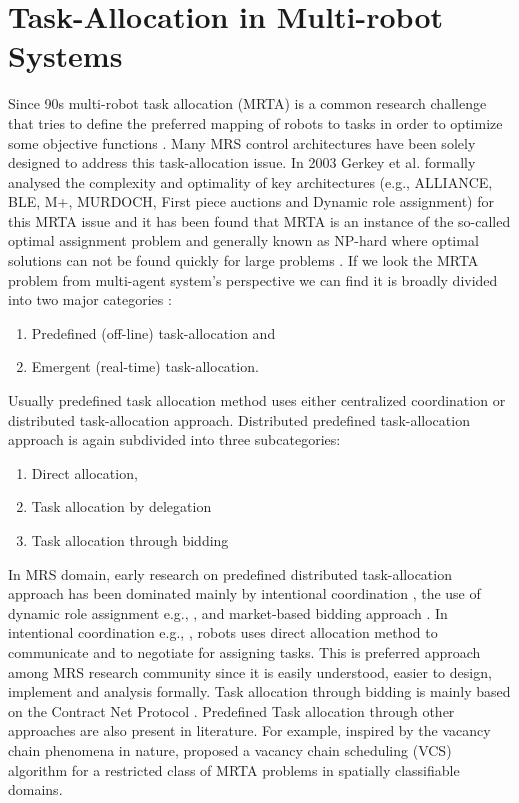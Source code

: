 \section{Task-Allocation in Multi-robot Systems}
Since 90s multi-robot task allocation (MRTA) is a common research challenge that tries to define the preferred mapping of robots to tasks in order to optimize some objective functions  \cite{Gerkey+2004}. Many MRS control architectures have been solely designed to address this task-allocation issue. In 2003 Gerkey et al. formally analysed the complexity and optimality of key architectures (e.g., ALLIANCE, BLE, M+, MURDOCH, First piece auctions and Dynamic role assignment) for this MRTA issue and it has been found that MRTA is an instance of the so-called optimal assignment problem \cite{Gerkey+2003} and generally known as NP-hard where optimal solutions can not be found quickly for large problems \cite{Gerkey+2004}. 
If we look the MRTA problem from multi-agent system's perspective we can find it is broadly divided into two major categories \cite{Shen+2001}: 
\begin{enumerate}
\item Predefined (off-line) task-allocation and 
\item Emergent (real-time) task-allocation. 
\end{enumerate}
Usually predefined task allocation method uses either centralized coordination or distributed task-allocation approach. Distributed predefined task-allocation approach is again subdivided into three subcategories: 
\begin{enumerate}
\item Direct allocation, 
\item Task allocation by delegation 
\item Task allocation through bidding
\end{enumerate}
In MRS domain, early research on predefined distributed task-allocation approach has been dominated mainly by intentional coordination \cite{Gerkey+2004,Parker1998}, the use of dynamic role assignment e.g., \cite{Chaimowicz2002}, and market-based bidding approach \cite{Dias+2006}. In intentional coordination e.g., \cite{Parker1998}, robots uses direct allocation method to communicate and to negotiate for assigning tasks. This is preferred approach among MRS research community since it is easily understood, easier to design, implement and analysis formally. Task allocation through bidding is mainly based on the Contract Net Protocol \cite{Davis1988+}. Predefined Task allocation through other approaches are also present in literature. For example, inspired by the vacancy chain phenomena in nature, \cite{Dahl+2003} proposed a vacancy chain scheduling (VCS) algorithm for a restricted class of MRTA problems in spatially classifiable domains.

